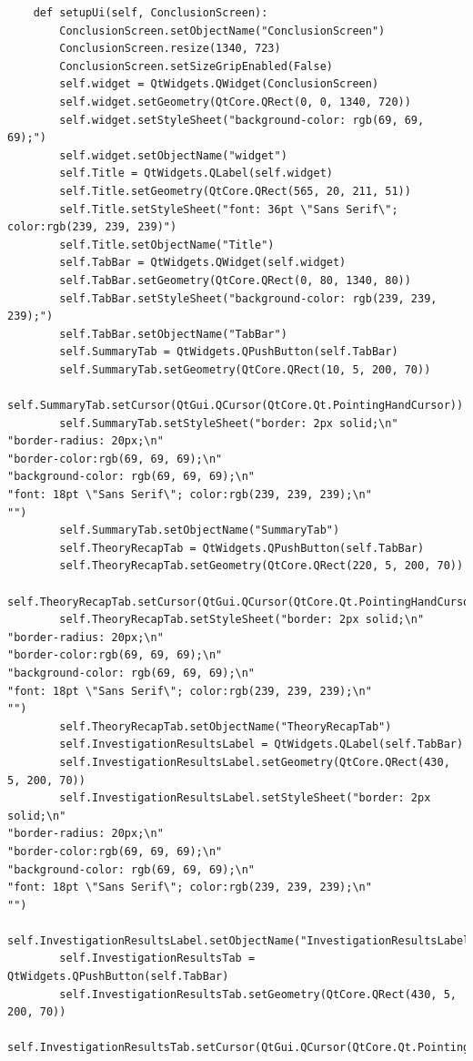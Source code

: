 \documentclass{article}
\begin{document}
\begin{lstlisting}
    def setupUi(self, ConclusionScreen):
        ConclusionScreen.setObjectName("ConclusionScreen")
        ConclusionScreen.resize(1340, 723)
        ConclusionScreen.setSizeGripEnabled(False)
        self.widget = QtWidgets.QWidget(ConclusionScreen)
        self.widget.setGeometry(QtCore.QRect(0, 0, 1340, 720))
        self.widget.setStyleSheet("background-color: rgb(69, 69, 69);")
        self.widget.setObjectName("widget")
        self.Title = QtWidgets.QLabel(self.widget)
        self.Title.setGeometry(QtCore.QRect(565, 20, 211, 51))
        self.Title.setStyleSheet("font: 36pt \"Sans Serif\"; color:rgb(239, 239, 239)")
        self.Title.setObjectName("Title")
        self.TabBar = QtWidgets.QWidget(self.widget)
        self.TabBar.setGeometry(QtCore.QRect(0, 80, 1340, 80))
        self.TabBar.setStyleSheet("background-color: rgb(239, 239, 239);")
        self.TabBar.setObjectName("TabBar")
        self.SummaryTab = QtWidgets.QPushButton(self.TabBar)
        self.SummaryTab.setGeometry(QtCore.QRect(10, 5, 200, 70))
        self.SummaryTab.setCursor(QtGui.QCursor(QtCore.Qt.PointingHandCursor))
        self.SummaryTab.setStyleSheet("border: 2px solid;\n"
"border-radius: 20px;\n"
"border-color:rgb(69, 69, 69);\n"
"background-color: rgb(69, 69, 69);\n"
"font: 18pt \"Sans Serif\"; color:rgb(239, 239, 239);\n"
"")
        self.SummaryTab.setObjectName("SummaryTab")
        self.TheoryRecapTab = QtWidgets.QPushButton(self.TabBar)
        self.TheoryRecapTab.setGeometry(QtCore.QRect(220, 5, 200, 70))
        self.TheoryRecapTab.setCursor(QtGui.QCursor(QtCore.Qt.PointingHandCursor))
        self.TheoryRecapTab.setStyleSheet("border: 2px solid;\n"
"border-radius: 20px;\n"
"border-color:rgb(69, 69, 69);\n"
"background-color: rgb(69, 69, 69);\n"
"font: 18pt \"Sans Serif\"; color:rgb(239, 239, 239);\n"
"")
        self.TheoryRecapTab.setObjectName("TheoryRecapTab")
        self.InvestigationResultsLabel = QtWidgets.QLabel(self.TabBar)
        self.InvestigationResultsLabel.setGeometry(QtCore.QRect(430, 5, 200, 70))
        self.InvestigationResultsLabel.setStyleSheet("border: 2px solid;\n"
"border-radius: 20px;\n"
"border-color:rgb(69, 69, 69);\n"
"background-color: rgb(69, 69, 69);\n"
"font: 18pt \"Sans Serif\"; color:rgb(239, 239, 239);\n"
"")
        self.InvestigationResultsLabel.setObjectName("InvestigationResultsLabel")
        self.InvestigationResultsTab = QtWidgets.QPushButton(self.TabBar)
        self.InvestigationResultsTab.setGeometry(QtCore.QRect(430, 5, 200, 70))
        self.InvestigationResultsTab.setCursor(QtGui.QCursor(QtCore.Qt.PointingHandCursor))

\end{lstlisting}
\end{document}
